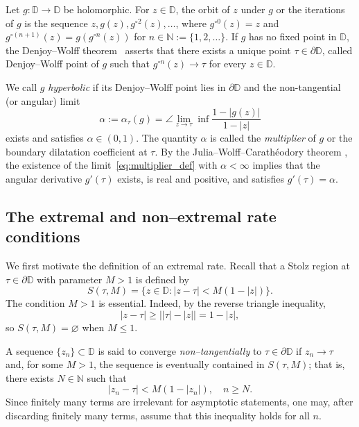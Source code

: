 \documentclass[12pt]{amsart}
\numberwithin{equation}{section}
\theoremstyle{plain}
\theoremstyle{definition}
\begin{document}
Let $g:\mathbb{D}\to\mathbb{D}$ be holomorphic.
For $z\in\mathbb{D}$, the orbit of $z$ under $g$ or the iterations of $g$
is the sequence $z, g(z), g^{\circ 2}(z),\ldots$,
where $g^{\circ 0}(z)=z$ and
$g^{\circ(n+1)}(z)=g(g^{\circ n}(z))$ for $n\in\mathbb{N}:=\{1,2,\ldots\}$.
If $g$ has no fixed point in $\mathbb{D}$, the Denjoy--Wolff
theorem~\cite[Theorem~1.8.4]{bracci2020} asserts that there
exists a unique point $\tau\in\partial\mathbb{D}$,
called Denjoy--Wolff point of $g$ such that
$g^{\circ n}(z)\to\tau$ for every $z\in\mathbb{D}$.

We call $g$ \textit{hyperbolic} if its Denjoy--Wolff point
lies in $\partial\mathbb{D}$ and the non-tangential (or angular) limit
\begin{equation}
\label{eq:multiplier_def}
\alpha:=\alpha_\tau(g)
=\angle\lim_{z\to\tau}\inf\frac{1-|g(z)|}{1-|z|}
\end{equation}
exists and satisfies $\alpha\in(0,1)$.
The quantity $\alpha$ is called the \textit{multiplier} of
$g$ or the boundary dilatation coefficient
at $\tau$.
By the Julia--Wolff--Carath\'eodory theorem
\cite[Theorem~1.7.3]{bracci2020}, the existence of the
limit~\eqref{eq:multiplier_def} with $\alpha<\infty$
implies that the angular derivative $g'(\tau)$ exists, is
real and positive, and satisfies $g'(\tau)=\alpha$.



\subsection{The extremal and non--extremal rate conditions}
\label{subsec:extremal_def}

We first motivate the definition of an extremal rate. Recall that a
Stolz region at $\tau\in\partial\mathbb{D}$ with parameter $M>1$ is
defined by
\begin{equation*}
S(\tau,M)
=
\{z\in\mathbb{D}: |z-\tau|<M(1-|z|)\}.
\end{equation*}
The condition $M>1$ is essential. Indeed, by the reverse triangle
inequality,
\begin{equation*}
|z-\tau|\geq \bigl||\tau|-|z|\bigr|=1-|z|,
\end{equation*}
so $S(\tau,M)=\varnothing$ when $M\leq1$.

A sequence $\{z_n\}\subset\mathbb{D}$ is said to converge
\emph{non--tangentially} to $\tau\in\partial\mathbb{D}$ if
$z_n\to\tau$ and, for some $M>1$, the sequence is eventually contained
in $S(\tau,M)$; that is, there exists $N\in\mathbb{N}$ such that
\begin{equation*}
|z_n-\tau|<M(1-|z_n|),\quad n\geq N.
\end{equation*}
Since finitely many terms are irrelevant for asymptotic statements,
one may, after discarding finitely many terms, assume that this
inequality holds for all $n$.
\end{document}
